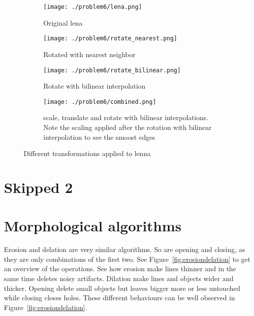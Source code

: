 \documentclass[a4paper]{scrartcl}
\begin{document}
\begin{figure}[H]
  \centering
  \begin{subfigure}[t]{0.4\textwidth}
    \texttt{[image: ./problem6/lena.png]}
    \caption{Original lena}
  \end{subfigure}
  \begin{subfigure}[t]{0.4\textwidth}
    \texttt{[image: ./problem6/rotate\_nearest.png]}
    \caption{Rotated with nearest neighbor}
  \end{subfigure}
  \begin{subfigure}[t]{0.4\textwidth}
    \texttt{[image: ./problem6/rotate\_bilinear.png]}
    \caption{Rotate with bilinear interpolation}
  \end{subfigure}
  \begin{subfigure}[t]{0.4\textwidth}
    \texttt{[image: ./problem6/combined.png]}
    \caption{scale, translate and rotate with bilinear interpolations. Note the scaling applied after the rotation with bilinear interpolation to see the smoost edges }
  \end{subfigure}
  \caption{Different transformations applied to lenna}
  \label{fig:transformations}
\end{figure}

\section{Skipped 2}

\section{Morphological algorithms}

Erosion and delation are very similar algorithms. So are opening and closing, as they are only combinations of the first two. See Figure~\ref{fig:erosiondelation} to get an overview of the operations.
See how erosion make lines thinner and in the same time deletes noisy artifacts. Dilation make lines and objects wider and thicker. Opening delete small objects but leaves bigger more or less untouched while closing closes holes. These different behaviours can be well observed in Figure~\ref{fig:erosiondelation}.
\end{document}
